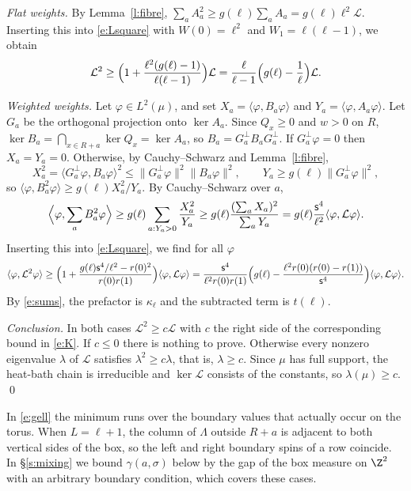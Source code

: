 \emph{Flat weights.} By Lemma~\ref{l:fibre}, $\sum_a A_a^2 \ge g(\ell) \sum_a A_a = g(\ell) \ell^2 \mathcal L$. Inserting this into \eqref{e:Lsquare} with $W(0) = \ell^2$ and $W_1 = \ell(\ell - 1)$, we obtain
\begin{equation*}
\mathcal L^2 \ge \Bigl( 1 + \frac{\ell^2 (g(\ell) - 1)}{\ell(\ell - 1)} \Bigr) \mathcal L = \frac{\ell}{\ell - 1} \Bigl( g(\ell) - \frac1\ell \Bigr) \mathcal L .
\end{equation*}

\emph{Weighted weights.} Let $\varphi \in L^2(\mu)$, and set $X_a = \langle \varphi, B_a \varphi \rangle$ and $Y_a = \langle \varphi, A_a \varphi \rangle$. Let $G_a$ be the orthogonal projection onto $\ker A_a$. Since $Q_x \ge 0$ and $w > 0$ on $R$, $\ker B_a = \bigcap_{x \in R + a} \ker Q_x = \ker A_a$, so $B_a = G_a^\perp B_a G_a^\perp$. If $G_a^\perp \varphi = 0$ then $X_a = Y_a = 0$. Otherwise, by Cauchy--Schwarz and Lemma~\ref{l:fibre},
\begin{equation*}
X_a^2 = \langle G_a^\perp \varphi, B_a \varphi \rangle^2 \le \|G_a^\perp \varphi\|^2 \|B_a \varphi\|^2, \qquad Y_a \ge g(\ell) \|G_a^\perp \varphi\|^2,
\end{equation*}
so $\langle \varphi, B_a^2 \varphi \rangle \ge g(\ell) X_a^2 / Y_a$. By Cauchy--Schwarz over $a$,
\begin{equation*}
\Bigl\langle \varphi, \sum_a B_a^2 \varphi \Bigr\rangle \ge g(\ell) \sum_{a : Y_a > 0} \frac{X_a^2}{Y_a} \ge g(\ell) \frac{(\sum_a X_a)^2}{\sum_a Y_a} = g(\ell) \frac{\mathsf s^4}{\ell^2} \langle \varphi, \mathcal L \varphi \rangle .
\end{equation*}
Inserting this into \eqref{e:Lsquare}, we find for all $\varphi$
\begin{equation*}
\langle \varphi, \mathcal L^2 \varphi \rangle \ge \Bigl( 1 + \frac{g(\ell) \mathsf s^4 / \ell^2 - r(0)^2}{r(0) r(1)} \Bigr) \langle \varphi, \mathcal L \varphi \rangle = \frac{\mathsf s^4}{\ell^2 r(0) r(1)} \Bigl( g(\ell) - \frac{\ell^2 r(0) (r(0) - r(1))}{\mathsf s^4} \Bigr) \langle \varphi, \mathcal L \varphi \rangle .
\end{equation*}
By \eqref{e:sums}, the prefactor is $\kappa_\ell$ and the subtracted term is $t(\ell)$.

\emph{Conclusion.} In both cases $\mathcal L^2 \ge c \mathcal L$ with $c$ the right side of the corresponding bound in \eqref{e:K}. If $c \le 0$ there is nothing to prove. Otherwise every nonzero eigenvalue $\lambda$ of $\mathcal L$ satisfies $\lambda^2 \ge c \lambda$, that is, $\lambda \ge c$. Since $\mu$ has full support, the heat-bath chain is irreducible and $\ker \mathcal L$ consists of the constants, so $\lambda(\mu) \ge c$. \qed

\begin{remark}\label{r:Kpins}
In \eqref{e:gell} the minimum runs over the boundary values that actually occur on the torus. When $L = \ell + 1$, the column of $\Lambda$ outside $R + a$ is adjacent to both vertical sides of the box, so the left and right boundary spins of a row coincide. In \S\ref{s:mixing} we bound $\gamma(a, \sigma)$ below by the gap of the box measure on $\Z^2$ with an arbitrary boundary condition, which covers these cases.
\end{remark}
